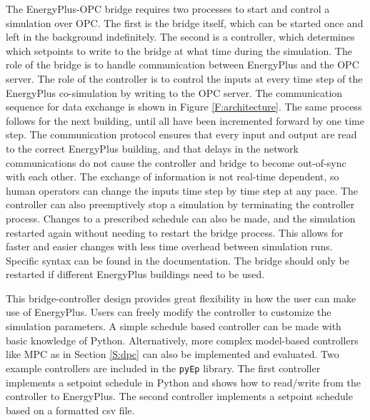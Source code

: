 The EnergyPlus-OPC bridge requires two processes to start and control a simulation over OPC. 
The first is the bridge itself, which can be started once and left in the background indefinitely. 
The second is a controller, which determines which setpoints to write to the bridge at what time during the simulation. 
The role of the bridge is to handle communication between EnergyPlus and the OPC server. 
The role of the controller is to control the inputs at every time step of the EnergyPlus co-simulation by writing to the OPC server.
The communication sequence for data exchange is shown in Figure \ref{F:architecture}.
The same process follows for the next building, until all have been incremented forward by one time step.
The communication protocol ensures that every input and output are read to the correct EnergyPlus building, and that delays in the network communications do not cause the controller and bridge to become out-of-sync with each other. 
The exchange of information is not real-time dependent, so human operators can change the inputs time step by time step at any pace. 
The controller can also preemptively stop a simulation by terminating the controller process. 
Changes to a prescribed schedule can also be made, and the simulation restarted again without needing to restart the bridge process. 
This allows for faster and easier changes with less time overhead between simulation runs.
Specific syntax can be found in the documentation. 
The bridge should only be restarted if different EnergyPlus buildings need to be used.

This bridge-controller design provides great flexibility in how the user can make use of EnergyPlus. 
Users can freely modify the controller to customize the simulation parameters. 
A simple schedule based controller can be made with basic knowledge of Python. 
Alternatively, more complex model-based controllers like MPC as in Section \ref{S:dpc} can also be implemented and evaluated.
Two example controllers are included in the \texttt{pyEp} library. 
The first controller implements a setpoint schedule in Python and shows how to read/write from the controller to EnergyPlus. 
The second controller implements a setpoint schedule based on a formatted csv file. 

